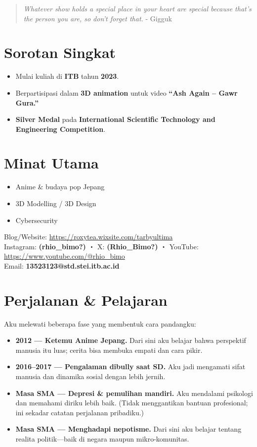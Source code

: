 \documentclass[
  letterpaper,
  DIV=11,
  numbers=noendperiod]{scrreprt}
\providecommand{\tightlist}{%
  \setlength{\itemsep}{0pt}\setlength{\parskip}{0pt}}
\begin{document}
\begin{quote}
\emph{Whatever show holds a special place in your heart are special
because that's the person you are, so don't forget that.} - Gigguk
\end{quote}

\section{Sorotan Singkat}\label{sorotan-singkat}

\begin{itemize}
\tightlist
\item
  Mulai kuliah di \textbf{ITB} tahun \textbf{2023}.
\item
  Berpartisipasi dalam \textbf{3D animation} untuk video \textbf{``Ash
  Again -- Gawr Gura.''}
\item
  \textbf{Silver Medal} pada \textbf{International Scientific Technology
  and Engineering Competition}.
\end{itemize}

\section{Minat Utama}\label{minat-utama}

\begin{itemize}
\tightlist
\item
  Anime \& budaya pop Jepang
\item
  3D Modelling / 3D Design
\item
  Cybersecurity
\end{itemize}

Blog/Website: \url{https://roxytea.wixsite.com/tarbyultima}\\
Instagram: \textbf{(\textbf{rhio\_bimo?})} ・ X:
\textbf{(\textbf{Rhio\_Bimo?})} ・ YouTube:
\url{https://www.youtube.com/@rhio_bimo}\\
Email: \textbf{13523123@std.stei.itb.ac.id}

\section{Perjalanan \& Pelajaran}\label{perjalanan-pelajaran}

Aku melewati beberapa fase yang membentuk cara pandangku:

\begin{itemize}
\tightlist
\item
  \textbf{2012 --- Ketemu Anime Jepang.} Dari sini aku belajar bahwa
  perspektif manusia itu luas; cerita bisa membuka empati dan cara
  pikir.
\item
  \textbf{2016--2017 --- Pengalaman dibully saat SD.} Aku jadi mengamati
  sifat manusia dan dinamika sosial dengan lebih jernih.
\item
  \textbf{Masa SMA --- Depresi \& pemulihan mandiri.} Aku mendalami
  psikologi dan memahami diriku lebih baik. (Tidak menggantikan bantuan
  profesional; ini sekadar catatan perjalanan pribadiku.)
\item
  \textbf{Masa SMA --- Menghadapi nepotisme.} Dari sini aku belajar
  tentang realita politik---baik di negara maupun mikro-komunitas.
\end{itemize}
\end{document}
